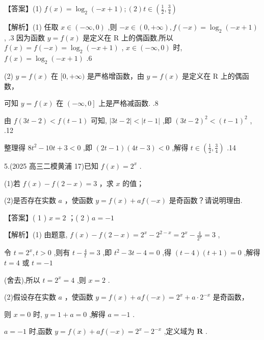 \documentclass[10pt]{article}
\begin{document}
【答案】(1) \(f\left( x\right)  = {\log }_{2}\left( {-x + 1}\right) ;\left( 2\right) t \in  \left( {\frac{1}{2},\frac{3}{4}}\right)\)

【解析】(1) 任取 \(x \in  \left( {-\infty ,0}\right)\) ,则 \(- x \in  \left( {0, + \infty }\right) ,f\left( {-x}\right)  = {\log }_{2}\left( {-x + 1}\right)\) , .3 因为函数 \(y = f\left( x\right)\) 是定义在 \(\mathrm{R}\) 上的偶函数,所以 \(f\left( x\right)  = f\left( {-x}\right)  = {\log }_{2}\left( {-x + 1}\right)\) , \(x \in  \left( {-\infty ,0}\right)\) 时, \(f\left( x\right)  = {\log }_{2}\left( {-x + 1}\right)\) .6

(2) \(y = f\left( x\right)\) 在 \(\lbrack 0, + \infty )\) 是严格增函数，由 \(y = f\left( x\right)\) 是定义在 \(\mathrm{R}\) 上的偶函数，

可知 \(y = f\left( x\right)\) 在 \(\left( {-\infty ,0}\right\rbrack\) 上是严格减函数. .8

由 \(f\left( {{3t} - 2}\right)  < f\left( {t - 1}\right)\) 可知, \(\left| {{3t} - 2}\right|  < \left| {t - 1}\right|\) ,即 \({\left( 3t - 2\right) }^{2} < {\left( t - 1\right) }^{2}\) , .12

整理得 \(8{t}^{2} - {10t} + 3 < 0\) ,即 \(\left( {{2t} - 1}\right) \left( {{4t} - 3}\right)  < 0\) ,解得 \(t \in  \left( {\frac{1}{2},\frac{3}{4}}\right)\) .14

5.(2025 高三二模黄浦 17)已知 \(f\left( x\right)  = {2}^{x}\) .

(1)若 \(f\left( x\right)  - f\left( {2 - x}\right)  = 3\) ，求 \(x\) 的值；

(2)是否存在实数 \(a\) ，使函数 \(y = f\left( x\right)  + {af}\left( {-x}\right)\) 是奇函数？请说明理由.

【答案】( 1 ) \(x = 2\) ；( 2 ) \(a =  - 1\)

【解析】(1) 由题意, \(f\left( x\right)  - f\left( {2 - x}\right)  = {2}^{x} - {2}^{2 - x} = {2}^{x} - \frac{4}{{2}^{x}} = 3\) ,

令 \(t = {2}^{x},t > 0\) ,则有 \(t - \frac{4}{t} = 3\) ,即 \({t}^{2} - {3t} - 4 = 0\) ,得 \(\left( {t - 4}\right) \left( {t + 1}\right)  = 0\) ,解得 \(t = 4\) 或 \(t =  - 1\)

(舍去),所以 \(t = {2}^{x} = 4\) ,则 \(x = 2\) .

(2)假设存在实数 \(a\) ，使函数 \(y = f\left( x\right)  + {af}\left( {-x}\right)  = {2}^{x} + a \cdot  {2}^{-x}\) 是奇函数，

则 \(x = 0\) 时, \(y = 1 + a = 0\) ,解得 \(a =  - 1\) .

\(a =  - 1\) 时,函数 \(y = f\left( x\right)  + {af}\left( {-x}\right)  = {2}^{x} - {2}^{-x}\) ,定义域为 \(\mathbf{R}\) .
\end{document}
